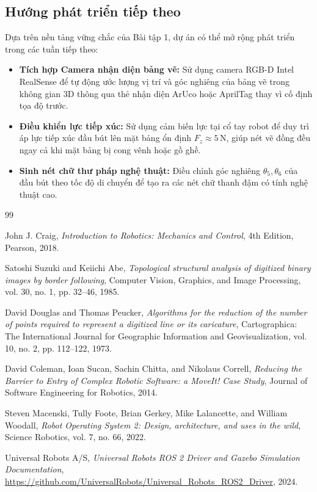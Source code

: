 \documentclass[a4paper,12pt]{article}
\begin{document}
\subsection{Hướng phát triển tiếp theo}
Dựa trên nền tảng vững chắc của Bài tập 1, dự án có thể mở rộng phát triển trong các tuần tiếp theo:
\begin{itemize}
    \item \textbf{Tích hợp Camera nhận diện bảng vẽ:} Sử dụng camera RGB-D Intel RealSense để tự động ước lượng vị trí và góc nghiêng của bảng vẽ trong không gian 3D thông qua thẻ nhận diện ArUco hoặc AprilTag thay vì cố định tọa độ trước.
    \item \textbf{Điều khiển lực tiếp xúc:} Sử dụng cảm biến lực tại cổ tay robot để duy trì áp lực tiếp xúc đầu bút lên mặt bảng ổn định $F_z \approx 5\,\text{N}$, giúp nét vẽ đồng đều ngay cả khi mặt bảng bị cong vênh hoặc gồ ghề.
    \item \textbf{Sinh nét chữ thư pháp nghệ thuật:} Điều chỉnh góc nghiêng $\theta_5, \theta_6$ của đầu bút theo tốc độ di chuyển để tạo ra các nét chữ thanh đậm có tính nghệ thuật cao.
\end{itemize}

\newpage
\begin{thebibliography}{99}

John J. Craig, \emph{Introduction to Robotics: Mechanics and Control}, 4th Edition, Pearson, 2018.

Satoshi Suzuki and Keiichi Abe, \emph{Topological structural analysis of digitized binary images by border following}, Computer Vision, Graphics, and Image Processing, vol. 30, no. 1, pp. 32--46, 1985.

David Douglas and Thomas Peucker, \emph{Algorithms for the reduction of the number of points required to represent a digitized line or its caricature}, Cartographica: The International Journal for Geographic Information and Geovisualization, vol. 10, no. 2, pp. 112--122, 1973.

David Coleman, Ioan Sucan, Sachin Chitta, and Nikolaus Correll, \emph{Reducing the Barrier to Entry of Complex Robotic Software: a MoveIt! Case Study}, Journal of Software Engineering for Robotics, 2014.

Steven Macenski, Tully Foote, Brian Gerkey, Mike Lalancette, and William Woodall, \emph{Robot Operating System 2: Design, architecture, and uses in the wild}, Science Robotics, vol. 7, no. 66, 2022.

Universal Robots A/S, \emph{Universal Robots ROS 2 Driver and Gazebo Simulation Documentation}, \url{https://github.com/UniversalRobots/Universal_Robots_ROS2_Driver}, 2024.

\end{thebibliography}
\end{document}

